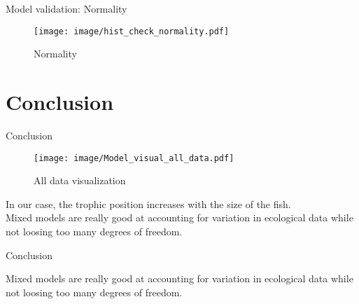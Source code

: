 \documentclass[unknownkeysallowed]{beamer}
\begin{document}
\begin{frame}{Model validation: Normality}

\begin{figure}
    \centering
    \texttt{[image: image/hist\_check\_normality.pdf]}
    \caption{Normality}
    \label{fig:my_label}
\end{figure}

\end{frame}

\section{Conclusion}
\label{sec:conclusion}


\begin{frame}{Conclusion}
\begin{figure}
    \centering
    \texttt{[image: image/Model\_visual\_all\_data.pdf]}
    \caption{All data visualization}
    \label{fig:my_label}
\end{figure}
In our case, the trophic position increases with the size of the fish.\\
\vspace{1cm}
Mixed models are really good at accounting for variation in ecological data while not loosing too many degrees of freedom.\\
\end{frame}

\begin{frame}{Conclusion}

Mixed models are really good at accounting for variation in ecological data while not loosing too many degrees of freedom.\\
\end{frame}

\end{document}
